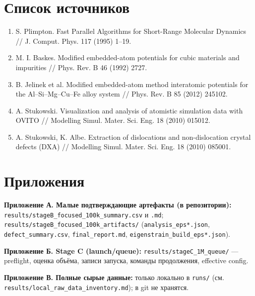 \documentclass[14pt,a4paper]{extarticle}
\newcommand{\code}[1]{\texttt{#1}}
\begin{document}
\section{Список источников}
\begin{enumerate}[leftmargin=1.8em,itemsep=1pt]
\item S. Plimpton. Fast Parallel Algorithms for Short-Range Molecular Dynamics // J. Comput. Phys. 117 (1995) 1–19.
\item M. I. Baskes. Modified embedded-atom potentials for cubic materials and impurities // Phys. Rev. B 46 (1992) 2727.
\item B. Jelinek et al. Modified embedded-atom method interatomic potentials for the Al–Si–Mg–Cu–Fe alloy system // Phys. Rev. B 85 (2012) 245102.
\item A. Stukowski. Visualization and analysis of atomistic simulation data with OVITO // Modelling Simul. Mater. Sci. Eng. 18 (2010) 015012.
\item A. Stukowski, K. Albe. Extraction of dislocations and non-dislocation crystal defects (DXA) // Modelling Simul. Mater. Sci. Eng. 18 (2010) 085001.
\end{enumerate}

\section{Приложения}
\textbf{Приложение А. Малые подтверждающие артефакты (в репозитории):} \code{results/stageB\_focused\_100k\_summary.csv} и \code{.md}; \code{results/stageB\_focused\_100k\_artifacts/} (\code{analysis\_eps*.json}, \code{defect\_summary.csv}, \code{final\_report.md}, \code{eigenstrain\_build\_eps*.json}).

\textbf{Приложение Б. Stage C (launch/queue):} \code{results/stageC\_1M\_queue/} — preflight, оценка объёма, записи запуска, команды продолжения, effective config.

\textbf{Приложение В. Полные сырые данные:} только локально в \code{runs/} (см. \code{results/local\_raw\_data\_inventory.md}); в git не хранятся.
\end{document}
